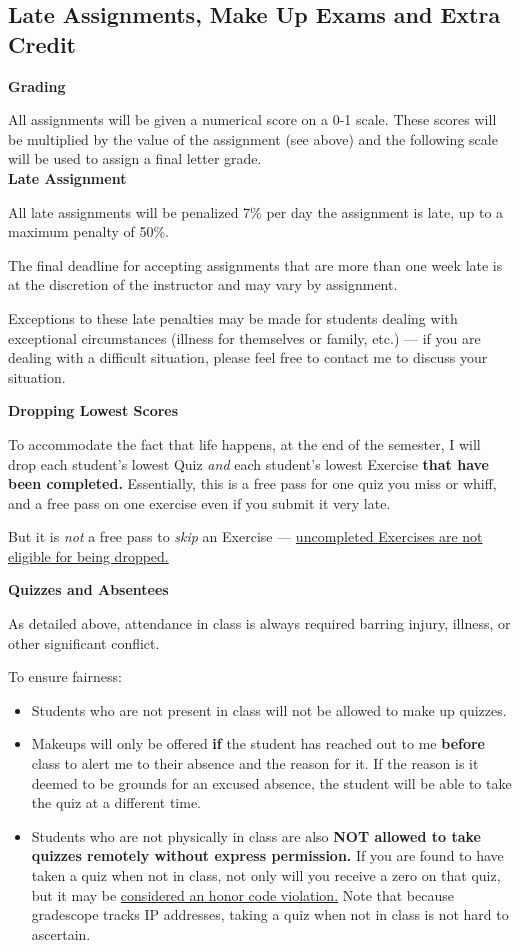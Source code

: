 \documentclass[12pt]{article}
\begin{document}
\subsection{Late Assignments, Make Up Exams and Extra Credit}


\textbf{Grading}

All assignments will be given a numerical score on a 0-1 scale.  These scores will be multiplied by the value of the assignment (see above) and the following scale will be used to assign a final letter grade.  \\


\textbf{Late Assignment}

All late assignments will be penalized 7\% per day the assignment is late, up to a maximum penalty of 50\%.

The final deadline for accepting assignments that are more than one week late is at the discretion of the instructor and may vary by assignment.

Exceptions to these late penalties may be made for students dealing with exceptional circumstances (illness for themselves or family, etc.) — if you are dealing with a difficult situation, please feel free to contact me to discuss your situation.

\textbf{Dropping Lowest Scores}

To accommodate the fact that life happens, at the end of the semester, I will drop each student's lowest Quiz \emph{and} each student's lowest Exercise \textbf{that have been completed.} Essentially, this is a free pass for one quiz you miss or whiff, and a free pass on one exercise even if you submit it very late.

But it is \emph{not} a free pass to \emph{skip} an Exercise — \underline{uncompleted Exercises are not eligible for being dropped.}


\textbf{Quizzes and Absentees}

As detailed above, attendance in class is always required barring injury, illness, or other significant conflict.

To ensure fairness:

\begin{itemize}
	\item Students who are not present in class will not be allowed to make up quizzes.
	\item Makeups will only be offered \textbf{if} the student has reached out to me \textbf{before} class to alert me to their absence and the reason for it. If the reason is it deemed to be grounds for an excused absence, the student will be able to take the quiz at a different time.
	\item Students who are not physically in class are also \textbf{NOT allowed to take quizzes remotely without express permission.} If you are found to have taken a quiz when not in class, not only will you receive a zero on that quiz, but it may be \underline{considered an honor code violation.} Note that because gradescope tracks IP addresses, taking a quiz when not in class is not hard to ascertain.
\end{itemize}
\end{document}
